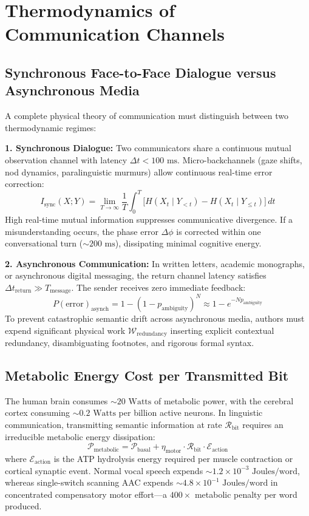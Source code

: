\documentclass[11pt,letterpaper]{article}
\begin{document}
\section{Thermodynamics of Communication Channels}

\subsection{Synchronous Face-to-Face Dialogue versus Asynchronous Media}
A complete physical theory of communication must distinguish between two thermodynamic regimes:

\textbf{1. Synchronous Dialogue:} Two communicators share a continuous mutual observation channel with latency $\Delta t < 100\text{ ms}$. Micro-backchannels (gaze shifts, nod dynamics, paralinguistic murmurs) allow continuous real-time error correction:
\begin{equation}
I_{\text{sync}}(X; Y) = \lim_{T \to \infty} \frac{1}{T} \int_0^T \Big[ H(X_t \mid Y_{<t}) - H(X_t \mid Y_{\le t}) \Big] \, dt
\end{equation}
High real-time mutual information suppresses communicative divergence. If a misunderstanding occurs, the phase error $\Delta \phi$ is corrected within one conversational turn ($\sim 200\text{ ms}$), dissipating minimal cognitive energy.

\textbf{2. Asynchronous Communication:} In written letters, academic monographs, or asynchronous digital messaging, the return channel latency satisfies $\Delta t_{\text{return}} \gg T_{\text{message}}$. The sender receives zero immediate feedback:
\begin{equation}
P(\text{error})_{\text{asynch}} = 1 - (1 - p_{\text{ambiguity}})^N \approx 1 - e^{-N p_{\text{ambiguity}}}
\end{equation}
To prevent catastrophic semantic drift across asynchronous media, authors must expend significant physical work $\mathcal{W}_{\text{redundancy}}$ inserting explicit contextual redundancy, disambiguating footnotes, and rigorous formal syntax.

\subsection{Metabolic Energy Cost per Transmitted Bit}
The human brain consumes $\sim 20\text{ Watts}$ of metabolic power, with the cerebral cortex consuming $\sim 0.2\text{ Watts}$ per billion active neurons. In linguistic communication, transmitting semantic information at rate $\mathcal{R}_{\text{bit}}$ requires an irreducible metabolic energy dissipation:
\begin{equation}
\mathcal{P}_{\text{metabolic}} = \mathcal{P}_{\text{basal}} + \eta_{\text{motor}} \cdot \mathcal{R}_{\text{bit}} \cdot \mathcal{E}_{\text{action}}
\end{equation}
where $\mathcal{E}_{\text{action}}$ is the ATP hydrolysis energy required per muscle contraction or cortical synaptic event. Normal vocal speech expends $\sim 1.2 \times 10^{-3}\text{ Joules/word}$, whereas single-switch scanning AAC expends $\sim 4.8 \times 10^{-1}\text{ Joules/word}$ in concentrated compensatory motor effort---a $400\times$ metabolic penalty per word produced.
\end{document}
